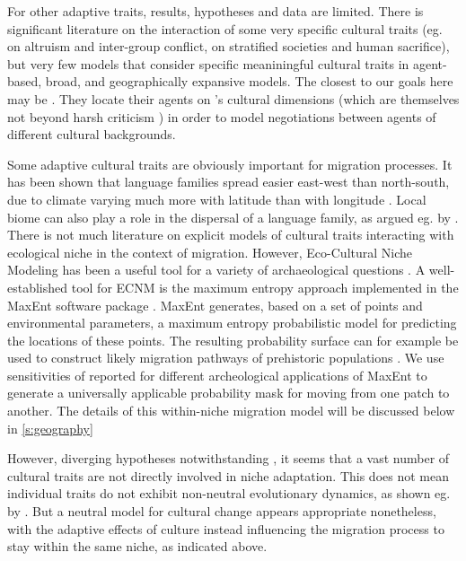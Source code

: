 \documentclass[a4paper,12pt]{scrartcl}
\begin{document}
For other adaptive traits, results, hypotheses and data are limited. There is
significant literature on the interaction of some very specific cultural traits
(eg. \textcite{rusch2014evolutionary} on altruism and inter-group conflict,
\textcite{watts2016ritual} on stratified societies and human sacrifice), but
very few models that consider specific meaniningful cultural traits in
agent-based, broad, and geographically expansive models. The closest to our
goals here may be \textcite{hofstede2012cultural}. They locate their agents on
\textcite{hofstede2001culture}'s cultural dimensions (which are themselves not
beyond harsh criticism
\parencite{mcsweeney2002hofstede,baskerville2003hofstede}) in order to model
negotiations between agents of different cultural backgrounds.

Some adaptive cultural traits are obviously important for migration processes.
It has been shown that language families spread easier east-west than
north-south, due to climate varying much more with latitude than with longitude
\parencite{}. Local biome can also play a role in the dispersal of a language
family, as argued eg. by \textcite{grollemund2015bantu,ehret2015bantu}. There is
not much literature on explicit models of cultural traits interacting with
ecological niche in the context of migration. However, Eco-Cultural Niche
Modeling \parencite[ECNM]{anks2006ecocultural} has been a useful tool for a
variety of archaeological questions
\cite{banks2008human,banks2013ecological,dalpoimguedes2014modeling,kondo2018ecological,walker2019persistence}.
A well-established tool for ECNM is the maximum entropy approach implemented in
the MaxEnt software package
\cite{phillips2006maximum,phillips2008modeling,maxenttutorial}. MaxEnt
generates, based on a set of points and environmental parameters, a maximum
entropy probabilistic model for predicting the locations of these points. The
resulting probability surface can for example be used to construct likely
migration pathways of prehistoric populations \cite{kondo2018ecological}. We use
sensitivities of reported for different archeological applications of MaxEnt
\cite{burke2017risky,gillespie2016predictive,jones2019mapping,kondo2012developing,kondo2018ecological,mcmichael2014bamboodominated,muttaqin2019maxent,oyarzun2016predicting,souza2020archaeological,walker2019persistence}
to generate a universally applicable probability mask for moving from one patch
to another. The details of this within-niche migration model will be discussed
below in \cref{s:geography}

However, diverging
hypotheses notwithstanding \parencite{tone-humidity,elevation-ejectives,etc}, it
seems that a vast number of cultural traits are not directly involved in niche
adaptation. This does not mean individual traits do not exhibit non-neutral
evolutionary dynamics, as shown eg. by \textcite{kandler2013non}. But a neutral
model for cultural change appears appropriate nonetheless, with the adaptive
effects of culture instead influencing the migration process to stay within the
same niche, as indicated above.
\end{document}
